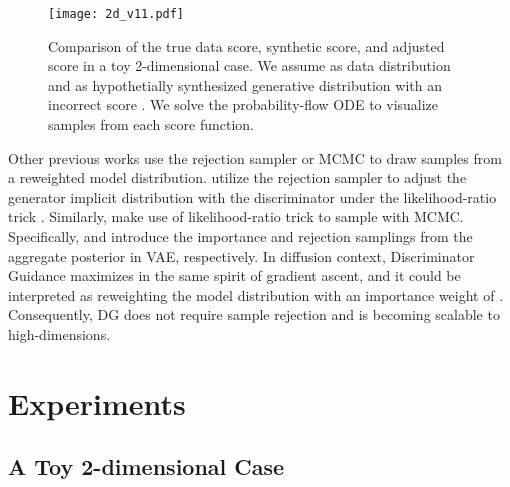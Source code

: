 \documentclass{article}
\theoremstyle{plain}
\theoremstyle{definition}
\theoremstyle{remark}
\begin{document}
\begin{figure}[t]
	\centering
	\texttt{[image: 2d\_v11.pdf]}
	\caption{Comparison of the true data score, synthetic score, and adjusted score in a toy 2-dimensional case. We assume  as data distribution and  as hypothetially synthesized generative distribution with an incorrect score . We solve the probability-flow ODE \cite{song2020score} to visualize samples from each score function.}
	\vskip -0.1in
	\label{fig:2d_two_modal}
\end{figure}

Other previous works use the rejection sampler or MCMC to draw samples from a reweighted model distribution. \citet{azadi2018discriminator, che2020your} utilize the rejection sampler to adjust the generator implicit distribution with the discriminator under the likelihood-ratio trick \cite{gutmann2010noise}. Similarly, \citet{turner2019metropolis} make use of likelihood-ratio trick to sample with MCMC. Specifically, \citet{aneja2021contrastive} and \citet{bauer2019resampled} introduce the importance and rejection samplings from the aggregate posterior in VAE, respectively. In diffusion context, Discriminator Guidance maximizes  in the same spirit of gradient ascent, and it could be interpreted as reweighting the model distribution  with an importance weight of . Consequently, DG does not require sample rejection and is becoming scalable to high-dimensions.

\section{Experiments}

\subsection{A Toy 2-dimensional Case}
\end{document}
